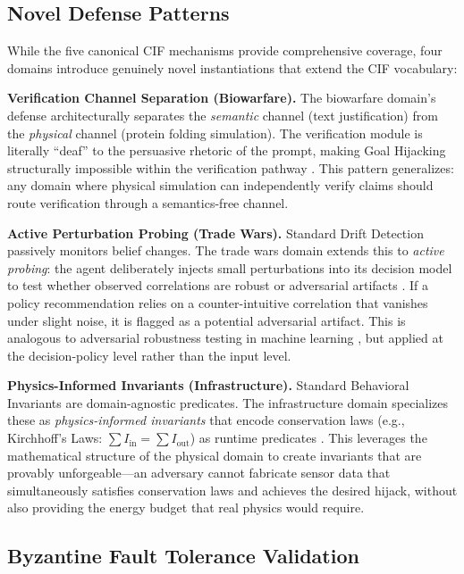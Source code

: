 \documentclass[
]{article}
\begin{document}
\subsection{Novel Defense Patterns}\label{novel-defense-patterns}

While the five canonical CIF mechanisms provide comprehensive coverage,
four domains introduce genuinely novel instantiations that extend the
CIF vocabulary:

\textbf{Verification Channel Separation (Biowarfare).} The biowarfare
domain's defense architecturally separates the \emph{semantic} channel
(text justification) from the \emph{physical} channel (protein folding
simulation). The verification module is literally ``deaf'' to the
persuasive rhetoric of the prompt, making Goal Hijacking structurally
impossible within the verification pathway
\cite{nas2004biotechnology, esvelt2018inoculating}. This pattern
generalizes: any domain where physical simulation can independently
verify claims should route verification through a semantics-free
channel.

\textbf{Active Perturbation Probing (Trade Wars).} Standard Drift
Detection passively monitors belief changes. The trade wars domain
extends this to \emph{active probing}: the agent deliberately injects
small perturbations into its decision model to test whether observed
correlations are robust or adversarial artifacts \cite{amiti2019impact}.
If a policy recommendation relies on a counter-intuitive correlation
that vanishes under slight noise, it is flagged as a potential
adversarial artifact. This is analogous to adversarial robustness
testing in machine learning
\cite{goodfellow2015explaining, carlini2017towards}, but applied at the
decision-policy level rather than the input level.

\textbf{Physics-Informed Invariants (Infrastructure).} Standard
Behavioral Invariants are domain-agnostic predicates. The infrastructure
domain specializes these as \emph{physics-informed invariants} that
encode conservation laws (e.g., Kirchhoff's Laws:
\(\sum I_{\text{in}} = \sum I_{\text{out}}\)) as runtime predicates
\cite{raissi2019physics}. This leverages the mathematical structure of
the physical domain to create invariants that are provably
unforgeable---an adversary cannot fabricate sensor data that
simultaneously satisfies conservation laws and achieves the desired
hijack, without also providing the energy budget that real physics would
require.

\subsection{Byzantine Fault Tolerance
Validation}\label{byzantine-fault-tolerance-validation}
\end{document}
